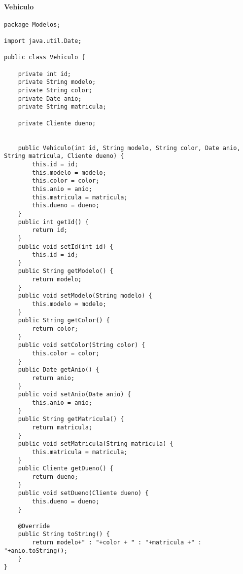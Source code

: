 \documentclass{article}
\begin{document}
\paragraph{Vehiculo}
\begin{lstlisting}
package Modelos;

import java.util.Date;

public class Vehiculo {
	
	private int id;
	private String modelo;
	private String color;
	private Date anio;
	private String matricula;

	private Cliente dueno;
	
	
	public Vehiculo(int id, String modelo, String color, Date anio, String matricula, Cliente dueno) {
		this.id = id;
		this.modelo = modelo;
		this.color = color;
		this.anio = anio;
		this.matricula = matricula;
		this.dueno = dueno;
	}
	public int getId() {
		return id;
	}
	public void setId(int id) {
		this.id = id;
	}
	public String getModelo() {
		return modelo;
	}
	public void setModelo(String modelo) {
		this.modelo = modelo;
	}
	public String getColor() {
		return color;
	}
	public void setColor(String color) {
		this.color = color;
	}
	public Date getAnio() {
		return anio;
	}
	public void setAnio(Date anio) {
		this.anio = anio;
	}
	public String getMatricula() {
		return matricula;
	}
	public void setMatricula(String matricula) {
		this.matricula = matricula;
	}
	public Cliente getDueno() {
		return dueno;
	}
	public void setDueno(Cliente dueno) {
		this.dueno = dueno;
	}
	
	@Override
	public String toString() {
		return modelo+" : "+color + " : "+matricula +" : "+anio.toString();
	}	
}
\end{lstlisting}
\clearpage
\end{document}
